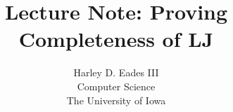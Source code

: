 \documentclass{article}
\begin{document}

\newtheorem{thm}{Theorem}
\newtheorem{lemma}[thm]{Lemma}

\newtheorem{corollary}[thm]{Corollary}
\newtheorem{definition}[thm]{Definition}
\newtheorem{remark}[thm]{Remark}
\newtheorem{proposition}[thm]{Proposition}
\newtheorem{notn}[thm]{Notation}
\newtheorem{observation}[thm]{Observation}

\newcommand{\interp}[1]{[\negthinspace[#1]\negthinspace]}
\newcommand{\normto}[0]{\rightsquigarrow^{!}}
\newcommand{\case}[4]{\text{case}\ #1\ \text{of}\ #2\text{.}#3\text{,}#2\text{.}#4}
\newcommand{\join}[0]{\downarrow}

\title{Lecture Note: Proving Completeness of LJ}
\author{Harley D. Eades III \\
Computer Science\\
The University of Iowa}

\maketitle
\end{document}
